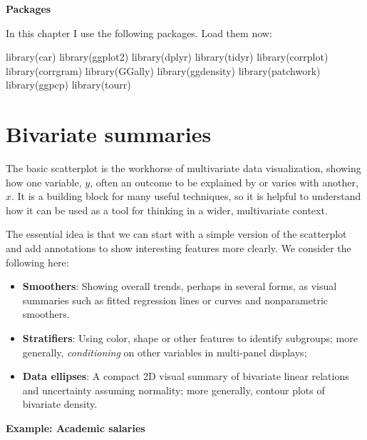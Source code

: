 \documentclass[
  letterpaper,
  10pt,
  krantz2]{krantz}
\makeatletter
\newenvironment{Shaded}{\begin{snugshade}}{\end{snugshade}}
\newcommand{\FunctionTok}[1]{\textcolor[rgb]{0.28,0.35,0.67}{#1}}
\newcommand{\NormalTok}[1]{\textcolor[rgb]{0.00,0.23,0.31}{#1}}
\providecommand{\tightlist}{%
  \setlength{\itemsep}{0pt}\setlength{\parskip}{0pt}}\usepackage{longtable,booktabs,array}
\newenvironment{kframe}{%
  \medskip{}
  \setlength{\fboxsep}{.8em}
  \def\at@end@of@kframe{}%
  \ifinner\ifhmode%
  \def\at@end@of@kframe{\end{minipage}}%
  \begin{minipage}{\columnwidth}%
  \fi\fi%
  \def\FrameCommand##1{\hskip\@totalleftmargin \hskip-\fboxsep
  \colorbox{shadecolor}{##1}\hskip-\fboxsep
      \hskip-\linewidth \hskip-\@totalleftmargin \hskip\columnwidth}%
  \MakeFramed {\advance\hsize-\width
    \@totalleftmargin\z@ \linewidth\hsize
    \@setminipage}}%
{\par\unskip\endMakeFramed%
  \at@end@of@kframe}
\renewenvironment{Shaded}{\begin{kframe}}{\end{kframe}}
\makeatother
\begin{document}
\textbf{Packages}

In this chapter I use the following packages. Load them now:

\begin{Shaded}
\begin{Highlighting}[]
\FunctionTok{library}\NormalTok{(car)}
\FunctionTok{library}\NormalTok{(ggplot2)}
\FunctionTok{library}\NormalTok{(dplyr)}
\FunctionTok{library}\NormalTok{(tidyr)}
\FunctionTok{library}\NormalTok{(corrplot)}
\FunctionTok{library}\NormalTok{(corrgram)}
\FunctionTok{library}\NormalTok{(GGally)}
\FunctionTok{library}\NormalTok{(ggdensity)}
\FunctionTok{library}\NormalTok{(patchwork)}
\FunctionTok{library}\NormalTok{(ggpcp)}
\FunctionTok{library}\NormalTok{(tourr)}
\end{Highlighting}
\end{Shaded}

\section{Bivariate summaries}\label{sec-bivariate_summaries}

The basic scatterplot is the workhorse of multivariate data
visualization, showing how one variable, \(y\), often an outcome to be
explained by or varies with another, \(x\). It is a building block for
many useful techniques, so it is helpful to understand how it can be
used as a tool for thinking in a wider, multivariate context.

The essential idea is that we can start with a simple version of the
scatterplot and add annotations to show interesting features more
clearly. We consider the following here:

\begin{itemize}
\tightlist
\item
  \textbf{Smoothers}: Showing overall trends, perhaps in several forms,
  as visual summaries such as fitted regression lines or curves and
  nonparametric smoothers.
\item
  \textbf{Stratifiers}: Using color, shape or other features to identify
  subgroups; more generally, \emph{conditioning} on other variables in
  multi-panel displays;
\item
  \textbf{Data ellipses}: A compact 2D visual summary of bivariate
  linear relations and uncertainty assuming normality; more generally,
  contour plots of bivariate density.
\end{itemize}

\textbf{Example: Academic salaries}
\end{document}

